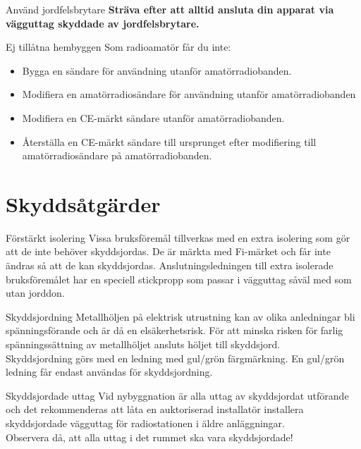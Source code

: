 \documentclass{beamer}
\begin{document}
\begin{frame}{Använd jordfelsbrytare}
\textbf{Sträva efter att alltid ansluta din apparat via vägguttag
	skyddade av jordfelsbrytare.}
\end{frame}

\begin{frame}{Ej tillåtna hembyggen}
Som radioamatör får du inte:
\begin{itemize}
	\item Bygga en sändare för användning utanför amatörradiobanden.
	\item Modifiera en amatörradiosändare för användning utanför amatörradiobanden
	\item Modifiera en CE-märkt sändare utanför amatörradiobanden.
	\item Återställa en CE-märkt sändare till ursprunget efter modifiering till
	amatörradiosändare på amatörradiobanden.
\end{itemize}
\end{frame}

\section{Skyddsåtgärder}
\begin{frame}{Förstärkt isolering}
Vissa bruksföremål tillverkas med en extra isolering som gör att de inte behöver
skyddsjordas.
De är märkta med Fi-märket och får inte ändras så att de kan skyddsjordas.
Anslutningsledningen till extra isolerade bruksföremålet har en speciell
stickpropp som passar i vägguttag såväl med som utan jorddon.
\end{frame}

\begin{frame}{Skyddsjordning}
Metallhöljen på elektrisk utrustning kan av olika anledningar bli
spänningsförande och är då en elsäkerhetsrisk.
För att minska risken för farlig spänningssättning av metallhöljet ansluts
höljet till skyddsjord.\\
\vspace{5mm}
Skyddsjordning görs med en ledning med gul/grön färgmärkning.
En gul/grön ledning får endast användas för skyddsjordning.
\end{frame}

\begin{frame}{Skyddsjordade uttag}
Vid nybyggnation är alla uttag av skyddsjordat utförande och det rekommenderas
att låta en auktoriserad installatör installera skyddsjordade vägguttag för
radiostationen i äldre anläggningar.\\
\vspace{5mm}
Observera då, att alla uttag i det rummet ska vara skyddsjordade!
\end{frame}
\end{document}
